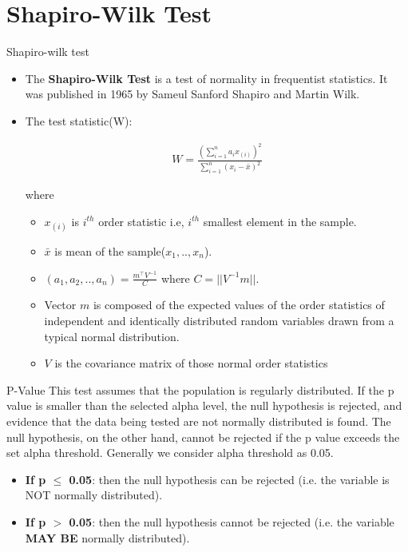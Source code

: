 \documentclass[10pt]{beamer}
\begin{document}
\section{Shapiro-Wilk Test}
\begin{frame}{Shapiro-wilk test}
   \begin{itemize}
       \item The \textbf{Shapiro-Wilk Test } is a test of normality in frequentist statistics. It was published in 1965 by Sameul Sanford Shapiro and Martin Wilk.
       \item The test statistic(W):
       \begin{block}{}
\begin{align}
    W=\frac{\left(\sum_{i=1}^{n}a_{i}x_{(i)}\right)^{2}}{\sum_{i=1}^{n}(x_{i}-\bar{x})^{2}}
\end{align}
\end{block}
where
\begin{itemize}
    \item $x_{(i)}$ is $i^{th}$ order statistic i.e, $i^{th}$ smallest element in the sample.
    \item $\bar{x}$ is mean of the sample($x_{1},..,x_{n}$). 
    \item $(a_{1},a_{2},..,a_{n})=\frac{m^{\top}V^{-1}}{C}$ where $C=||V^{-1}m||$.
    \item Vector $m$ is composed of the expected values of the order statistics of independent and identically distributed random variables drawn from a typical normal distribution.
    \item $V$ is the covariance matrix of those normal order statistics
\end{itemize}
   \end{itemize} 
\end{frame}
\begin{frame}{P-Value}
    This test assumes that the population is regularly distributed. If the p value is smaller than the selected alpha level, the null hypothesis is rejected, and evidence that the data being tested are not normally distributed is found. The null hypothesis, on the other hand, cannot be rejected if the p value exceeds the set alpha threshold. Generally we consider alpha threshold as 0.05.
\begin{itemize}
    \item \textbf{If p $\leq$ 0.05}: then the null hypothesis can be rejected (i.e. the variable is NOT normally distributed).
    \item \textbf{If p $>$ 0.05}: then the null hypothesis cannot be rejected (i.e. the variable \color{red} \textbf{MAY BE} \color{black}normally distributed).
\end{itemize}
\end{frame}
\end{document}
